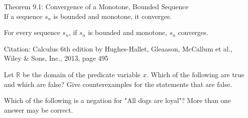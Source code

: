 \documentclass[12pt,letterpaper, onecolumn]{exam}
\begin{document}
\begin{questions}
	\begin{solution}
		Theorem 9.1: Convergence of a Monotone, Bounded Sequence\\
		If a sequence $s_n$ is bounded and monotone, it converges.
		
		For every sequence $s_n$, if $s_n$ is bounded and monotone, $s_n$ converges.
		
		Citation: Calculus 6th edition by Hughes-Hallet, Gleaason, McCallum et al., Wiley \& Sons, Inc., 2013, page 495
	\end{solution}
	
	\question Let $\mathbb{R}$ be the domain of the predicate variable $x$. Which of the following are true and which are false? Give counterexamples for the statements that are false. 
	\begin{solution}
	\end{solution}
		
	\question Which of the following is a negation for "All dogs are loyal"? More than one answer may be correct.
\end{questions}
\end{document}
